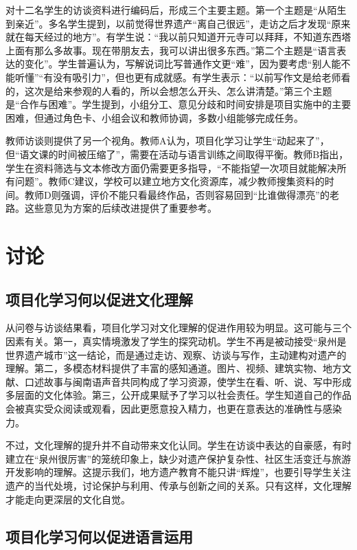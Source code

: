 对十二名学生的访谈资料进行编码后，形成三个主要主题。第一个主题是“从陌生到亲近”。多名学生提到，以前觉得世界遗产“离自己很远”，走访之后才发现“原来就在每天经过的地方”。有学生说：“我以前只知道开元寺可以拜拜，不知道东西塔上面有那么多故事。现在带朋友去，我可以讲出很多东西。”第二个主题是“语言表达的变化”。学生普遍认为，写解说词比写普通作文更“难”，因为要考虑“别人能不能听懂”“有没有吸引力”，但也更有成就感。有学生表示：“以前写作文是给老师看的，这次是给来参观的人看的，所以会想怎么开头、怎么讲清楚。”第三个主题是“合作与困难”。学生提到，小组分工、意见分歧和时间安排是项目实施中的主要困难，但通过角色卡、小组会议和教师协调，多数小组能够完成任务。

教师访谈则提供了另一个视角。教师A认为，项目化学习让学生“动起来了”，但“语文课的时间被压缩了”，需要在活动与语言训练之间取得平衡。教师B指出，学生在资料筛选与文本修改方面仍需要更多指导，“不能指望一次项目就能解决所有问题”。教师C建议，学校可以建立地方文化资源库，减少教师搜集资料的时间。教师D则强调，评价不能只看最终作品，否则容易回到“比谁做得漂亮”的老路。这些意见为方案的后续改进提供了重要参考。

\section{讨论}

\subsection{项目化学习何以促进文化理解}

从问卷与访谈结果看，项目化学习对文化理解的促进作用较为明显。这可能与三个因素有关。第一，真实情境激发了学生的探究动机。学生不再是被动接受“泉州是世界遗产城市”这一结论，而是通过走访、观察、访谈与写作，主动建构对遗产的理解。第二，多模态材料提供了丰富的感知通道。图片、视频、建筑实物、地方文献、口述故事与闽南语声音共同构成了学习资源，使学生在看、听、说、写中形成多层面的文化体验。第三，公开成果赋予了学习以社会责任。学生知道自己的作品会被真实受众阅读或观看，因此更愿意投入精力，也更在意表达的准确性与感染力。

不过，文化理解的提升并不自动带来文化认同。学生在访谈中表达的自豪感，有时建立在“泉州很厉害”的笼统印象上，缺少对遗产保护复杂性、社区生活变迁与旅游开发影响的理解。这提示我们，地方遗产教育不能只讲“辉煌”，也要引导学生关注遗产的当代处境，讨论保护与利用、传承与创新之间的关系。只有这样，文化理解才能走向更深层的文化自觉。

\subsection{项目化学习何以促进语言运用}

